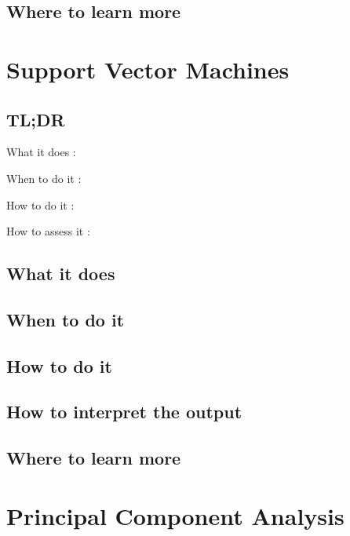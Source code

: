 \documentclass[
]{book}
\begin{document}
\hypertarget{where-to-learn-more-19}{%
\section{Where to learn more}\label{where-to-learn-more-19}}

\hypertarget{support-vector-machines}{%
\chapter{Support Vector Machines}\label{support-vector-machines}}

\hypertarget{tldr-20}{%
\section{TL;DR}\label{tldr-20}}

What it does
:

When to do it
:

How to do it
:

How to assess it
:

\hypertarget{what-it-does-20}{%
\section{What it does}\label{what-it-does-20}}

\hypertarget{when-to-do-it-20}{%
\section{When to do it}\label{when-to-do-it-20}}

\hypertarget{how-to-do-it-20}{%
\section{How to do it}\label{how-to-do-it-20}}

\hypertarget{how-to-interpret-the-output-20}{%
\section{How to interpret the output}\label{how-to-interpret-the-output-20}}

\hypertarget{where-to-learn-more-20}{%
\section{Where to learn more}\label{where-to-learn-more-20}}

\hypertarget{principal-component-analysis}{%
\chapter{Principal Component Analysis}\label{principal-component-analysis}}
\end{document}
